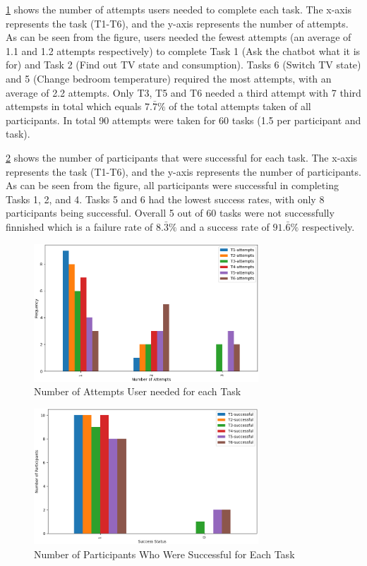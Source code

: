 \cref{fig:task-attempts} shows the number of attempts users needed to complete each task. The x-axis represents the task (T1-T6), and the y-axis represents the number of attempts. As can be seen from the figure, users needed the fewest attempts (an average of 1.1 and 1.2 attempts respectively) to complete Task 1 (Ask the chatbot what it is for) and Task 2 (Find out TV state and consumption). Tasks 6 (Switch TV state) and 5 (Change bedroom temperature) required the most attempts, with an average of 2.2 attempts.
Only T3, T5 and T6 needed a third attempt with 7 third attempsts in total which equals $7.\bar{7}\%$ of the total attempts taken of all participants. In total 90 attempts were taken for 60 tasks (1.5 per participant and task). 

\cref{fig:task-success} shows the number of participants that were successful for each task. The x-axis represents the task (T1-T6), and the y-axis represents the number of participants. As can be seen from the figure, all participants were successful in completing Tasks 1, 2, and 4. Tasks 5 and 6 had the lowest success rates, with only 8 participants being successful. Overall 5 out of 60 tasks were not successfully finnished which is a failure rate of $8.\bar{3}\%$ and a success rate of $91.\bar{6}\%$ respectively.

\begin{figure}[h]
    \centering
    \captionsetup{justification=centering}
    \includegraphics[width=0.75\textwidth]{graphics/task-attempts.png}
    \caption{Number of Attempts User needed for each Task}
    \label{fig:task-attempts}
\end{figure}
\begin{figure}[h]
    \centering
    \captionsetup{justification=centering}
    \includegraphics[width=0.75\textwidth]{graphics/task-success.png}
    \caption{Number of Participants Who Were Successful for Each Task}
    \label{fig:task-success}
\end{figure}

